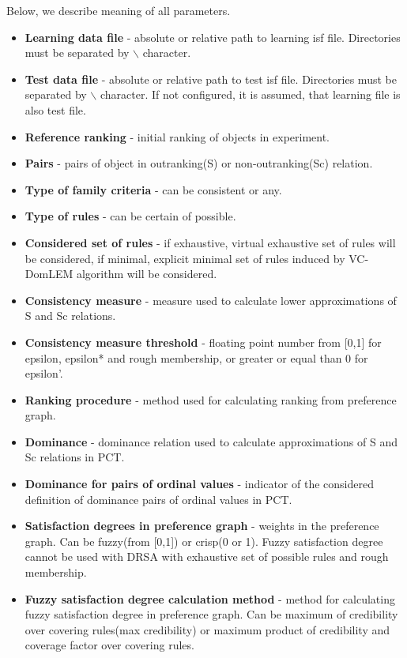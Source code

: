 Below, we describe meaning of all parameters.
\begin{itemize}
	\item \textbf{Learning data file} - absolute or relative path to learning isf file. Directories must be separated by $\backslash$ character.
	\item \textbf{Test data file} - absolute or relative path to test isf file. Directories must be separated by $\backslash$ character. If not configured, it is assumed, that learning file is also test file.
	\item \textbf{Reference ranking} - initial ranking of objects in experiment.
	\item \textbf{Pairs} - pairs of object in outranking(S) or non-outranking(Sc) relation.
	\item \textbf{Type of family criteria} - can be consistent or any.
	\item \textbf{Type of rules} - can be certain of possible.
	\item \textbf{Considered set of rules} - if exhaustive, virtual exhaustive set of rules will be considered, if minimal, explicit minimal set of rules induced by VC-DomLEM algorithm will be considered.
	\item \textbf{Consistency measure} - measure used to calculate lower approximations of S and Sc relations.
	\item \textbf{Consistency measure threshold} - floating point number from [0,1] for epsilon, epsilon* and rough membership, or greater or equal than 0 for epsilon'.
	\item \textbf{Ranking procedure} - method used for calculating ranking from preference graph.
	\item \textbf{Dominance} - dominance relation used to calculate approximations of S and Sc relations in PCT.
	\item \textbf{Dominance for pairs of ordinal values} - indicator of the considered definition of dominance pairs of ordinal values in PCT.
	\item \textbf{Satisfaction degrees in preference graph} - weights in the preference graph. Can be fuzzy(from [0,1]) or crisp(0 or 1). Fuzzy satisfaction degree cannot be used with DRSA with exhaustive set of possible rules and rough membership.
	\item \textbf{Fuzzy satisfaction degree calculation method} - method for calculating fuzzy satisfaction degree in preference graph. Can be maximum of credibility over covering rules(max credibility) or maximum product of credibility and coverage factor over covering rules.

\end{itemize}

